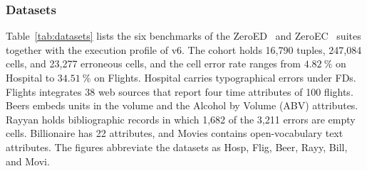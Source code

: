 \documentclass[conference]{IEEEtran}
\begin{document}
\subsubsection{Datasets}
Table~\ref{tab:datasets} lists the six benchmarks of the ZeroED~\cite{ni2025zeroed} and ZeroEC~\cite{chen2025zeroec} suites together with the execution profile of v6. The cohort holds 16,790 tuples, 247,084 cells, and 23,277 erroneous cells, and the cell error rate ranges from $4.82~\%$ on Hospital to $34.51~\%$ on Flights. Hospital carries typographical errors under FDs. Flights integrates 38 web sources that report four time attributes of 100 flights. Beers embeds units in the volume and the Alcohol by Volume (ABV) attributes. Rayyan holds bibliographic records in which 1,682 of the 3,211 errors are empty cells. Billionaire has 22 attributes, and Movies contains open-vocabulary text attributes. The figures abbreviate the datasets as Hosp, Flig, Beer, Rayy, Bill, and Movi.
\end{document}
